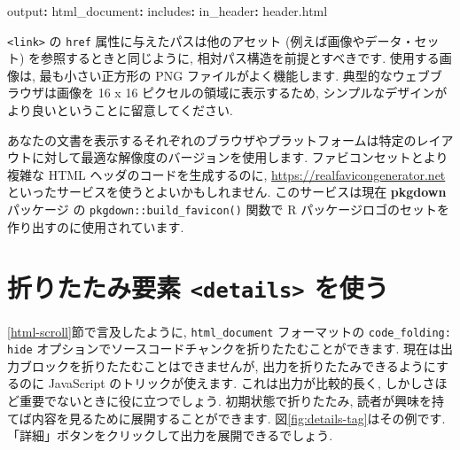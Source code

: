 \documentclass[
  11pt,
]{bxjsreport}
\newenvironment{Shaded}{\begin{snugshade}}{\end{snugshade}}
\newcommand{\AttributeTok}[1]{\textcolor[rgb]{0.77,0.63,0.00}{#1}}
\newcommand{\FunctionTok}[1]{\textcolor[rgb]{0.00,0.00,0.00}{#1}}
\newcommand{\KeywordTok}[1]{\textcolor[rgb]{0.13,0.29,0.53}{\textbf{#1}}}
\begin{document}
\begin{Shaded}
\begin{Highlighting}[]
\FunctionTok{output}\KeywordTok{:}
\AttributeTok{  }\FunctionTok{html\_document}\KeywordTok{:}
\AttributeTok{    }\FunctionTok{includes}\KeywordTok{:}
\AttributeTok{      }\FunctionTok{in\_header}\KeywordTok{:}\AttributeTok{ header.html}
\end{Highlighting}
\end{Shaded}

\texttt{\textless{}link\textgreater{}} の \texttt{href} 属性に与えたパスは他のアセット (例えば画像やデータ・セット) を参照するときと同じように, 相対パス構造を前提とすべきです. 使用する画像は, 最も小さい正方形の PNG ファイルがよく機能します. 典型的なウェブブラウザは画像を 16 x 16 ピクセルの領域に表示するため, シンプルなデザインがより良いということに留意してください.

あなたの文書を表示するそれぞれのブラウザやプラットフォームは特定のレイアウトに対して最適な解像度のバージョンを使用します. ファビコンセットとより複雑な HTML ヘッダのコードを生成するのに, \url{https://realfavicongenerator.net} といったサービスを使うとよいかもしれません. このサービスは現在 \textbf{pkgdown} パッケージ \autocite{R-pkgdown} の \texttt{pkgdown::build\_favicon()} 関数で R パッケージロゴのセットを作り出すのに使用されています.

\hypertarget{details-tag}{%
\section{\texorpdfstring{折りたたみ要素 \texttt{\textless{}details\textgreater{}} を使う}{折りたたみ要素 \textless details\textgreater{} を使う}}\label{details-tag}}

\ref{html-scroll}節で言及したように, \texttt{html\_document} フォーマットの \texttt{code\_folding: hide} オプションでソースコードチャンクを折りたたむことができます. 現在は出力ブロックを折りたたむことはできませんが, 出力を折りたたみできるようにするのに JavaScript のトリックが使えます. これは出力が比較的長く, しかしさほど重要でないときに役に立つでしょう. 初期状態で折りたたみ, 読者が興味を持てば内容を見るために展開することができます. 図\ref{fig:details-tag}はその例です. 「詳細」ボタンをクリックして出力を展開できるでしょう.
\end{document}
